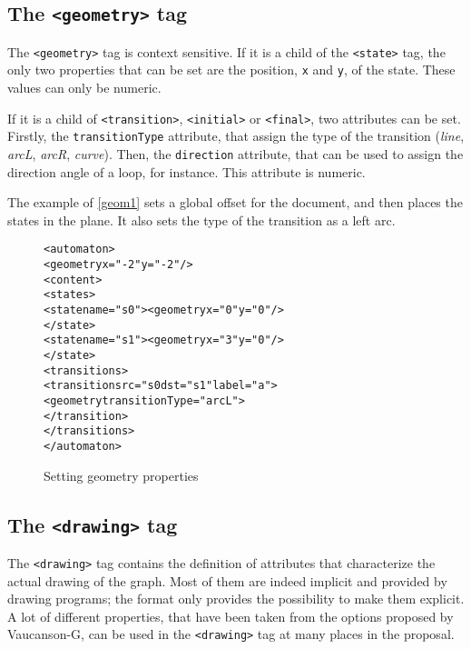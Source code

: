 \documentclass[a4paper]{article}
\def\statetag{\texttt{<state>}}
\def\dstname{\texttt{dst}}
\def\srcname{\texttt{src}}
\def\transitiontag{\texttt{<transition>}}
\def\finaltag{\texttt{<final>}}
\def\initialtag{\texttt{<initial>}}
\def\geometrytag{\texttt{<geometry>}}
\def\drawingtag{\texttt{<drawing>}}
\begin{document}
\subsection{The \geometrytag{} tag}

The \geometrytag{} tag is context sensitive. If it is a child of
the \statetag{} tag, the only two properties that can be set are the
position, \verb|x| and \verb|y|, of the state. These values can only be numeric.

If it is a child of \transitiontag{}, \initialtag{} or
\finaltag{}, two attributes can be set. Firstly, the \texttt{transitionType}
attribute, that assign the type of the transition (\textit{line},
\textit{arcL}, \textit{arcR}, \textit{curve}). Then, the
\texttt{direction} attribute, that can be used to assign the direction
angle of a loop, for instance. This attribute is numeric.

The example of \autoref{geom1} sets a global offset
for the document, and then places the states in the plane.
It also sets the type of the transition as a left arc.
{\small

\begin{figure}[h]
  \begin{center}
\begin{alltt}
<automaton>
  <geometry x="-2" y="-2"/>
  <content>
     <states>
        <state name="s0"><geometry x="0" y="0"/>
        </state>
        <state name="s1"><geometry x="3" y="0"/>
        </state>
     <transitions>
        <transition \srcname{}="s0 \dstname{}="s1" label="a">
          <geometry transitionType="arcL">
        </transition>
     </transitions>
</automaton>
\end{alltt}

\caption{Setting geometry properties}
\label{geom1}
  \end{center}
\end{figure}

}

\subsection{The \drawingtag{} tag}

The \drawingtag{} tag contains the definition of attributes that characterize
the actual drawing of the graph.
Most of them are indeed implicit and provided by drawing programs; the
format only provides the possibility to make them explicit.
A lot of different properties, that have been taken from the options proposed by
Vaucanson-G, can be used in the \drawingtag{} tag at many places in the proposal.
\end{document}
